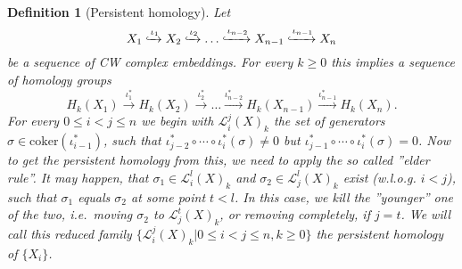 \documentclass[11pt, a4paper, UKenglish]{article}
\newtheorem{definition}{Definition}
\newcommand{\coker}{\textrm{coker}}
\begin{document}
    \begin{definition}[Persistent homology]
        Let \[X_1\xhookrightarrow{\iota_1} X_2\xhookrightarrow{\iota_2} \ldots\xhookrightarrow{\iota_{n-2}} X_{n-1}\xhookrightarrow{\iota_{n-1}} X_n\] be a sequence of CW complex embeddings.
        For every $k\geq 0$ this implies a sequence of homology groups
        \[H_k(X_1)\xrightarrow{\iota_{1}^*} H_k(X_2)\xrightarrow{\iota_{2}^*}\ldots \xrightarrow{\iota_{n-2}^*} H_k(X_{n-1})\xrightarrow{\iota_{n-1}^*} H_k(X_n).\]
        For every $0\leq i<j\leq n$ we begin with $\mathcal{L}_i^j(X)_k$ the set of generators $\sigma\in\coker(\iota_{i-1}^*)$, such that $\iota_{j-2}^*\circ\cdots\circ\iota_{i}^*(\sigma)\neq0$ but $\iota_{j-1}^*\circ\cdots\circ\iota_{i}^*(\sigma)=0$.
        Now to get the persistent homology from this, we need to apply the so called ''elder rule''.
        It may happen, that $\sigma_1\in\mathcal{L}_i^l(X)_k$ and $\sigma_2\in\mathcal{L}_j^l(X)_k$ exist (w.l.o.g. $i<j$), such that $\sigma_1$ equals $\sigma_2$ at some point $t<l$.
        In this case, we kill the ''younger'' one of the two, i.e.\ moving $\sigma_2$ to $\mathcal{L}_j^t(X)_k$, or removing completely, if $j=t$.
        We will call this reduced family $\{\mathcal{L}_i^j(X)_k|0\leq i<j\leq n,k\geq0\}$ the persistent homology of $\{X_i\}$.
    \end{definition}
\end{document}
